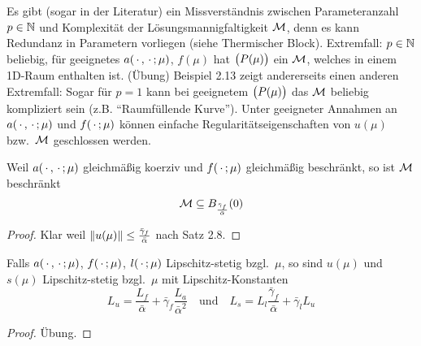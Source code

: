 \begin{bem}
	Es gibt (sogar in der Literatur) ein Missverständnis zwischen Parameteranzahl $p \in \mathbb{N}$ und Komplexität der Lösungsmannigfaltigkeit $\mathcal{M}$, denn es kann Redundanz in Parametern vorliegen (siehe Thermischer Block).
	Extremfall: $p \in \mathbb{N}$ beliebig, für geeignetes $a(\,\cdot\,,\,\cdot\,;\mu)$, $f(\mu)$ hat $\big(P(\mu)\big)$ ein $\mathcal{M}$, welches in einem 1D-Raum enthalten ist. (Übung)
	Beispiel 2.13 zeigt andererseits einen anderen Extremfall: Sogar für $p=1$ kann bei geeignetem $\big(P(\mu)\big)$ das $\mathcal{M}$ beliebig kompliziert sein (z.B. ``Raumfüllende Kurve'').
	Unter geeigneter Annahmen an $a(\,\cdot\,,\,\cdot\,;\mu)$ und $f(\,\cdot\,;\mu)$ können einfache Regularitätseigenschaften von $u(\mu)$ bzw.\ $\mathcal{M}$ geschlossen werden.
\end{bem}

\begin{kor}
	Weil $a(\,\cdot\,,\,\cdot\,;\mu)$ gleichmäßig koerziv und $f(\,\cdot\,;\mu)$ gleichmäßig beschränkt, so ist $\mathcal{M}$ beschränkt
	\[
		\mathcal{M} \subseteq B_{\frac{\bar\gamma_f}{\bar\alpha}}(0)
	\]

	\begin{proof}
		Klar weil $\|u(\mu)\| \leq \frac{\bar\gamma_f}{\bar\alpha}$ nach Satz 2.8.
	\end{proof}
\end{kor}

\begin{satz}
	Falls $a(\,\cdot\,,\,\cdot\,;\mu)$, $f(\,\cdot\,;\mu)$, $l(\,\cdot\,;\mu)$ Lipschitz-stetig bzgl.\ $\mu$, so sind $u(\mu)$ und $s(\mu)$ Lipschitz-stetig bzgl.\ $\mu$ mit Lipschitz-Konstanten
	\[
		L_u = \frac{L_f}{\bar\alpha} + \bar\gamma_f \frac{L_a}{\bar\alpha^2} \quad \text{und} \quad L_s = L_l \frac{\bar\gamma_f}{\bar\alpha} + \bar\gamma_l L_u
	\]

	\begin{proof}
		Übung.
	\end{proof}
\end{satz}

